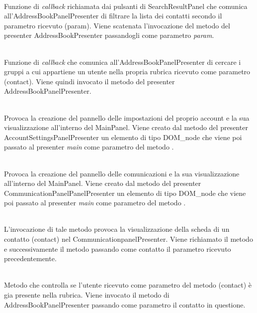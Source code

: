 \begin{description}
\item{}\\
Funzione di \textit{callback} richiamata dai pulsanti di SearchResultPanel che comunica all'AddressBookPanelPresenter di filtrare la lista dei contatti secondo il parametro ricevuto (param). Viene scatenata l'invocazione del metodo  del presenter AddressBookPresenter passandogli come parametro \textit{param}.

\item{}\\
Funzione di \textit{callback} che comunica all'AddressBookPanelPresenter di cercare i gruppi a cui appartiene un utente nella propria rubrica ricevuto come parametro (contact). Viene quindi invocato il metodo  del presenter AddressBookPanelPresenter.

\item{}\\
Provoca la creazione del pannello delle impostazioni del proprio account e la sua visualizzazione all'interno del MainPanel. Viene creato dal metodo  del presenter AccountSettingsPanelPresenter un elemento di tipo DOM\_node che viene poi passato al presenter \textit{main} come parametro del metodo .


\item{}\\
Provoca la creazione del pannello delle comunicazioni e la sua visualizzazione all'interno del MainPanel. Viene creato dal metodo  del presenter CommunicationPanelPanelPresenter un elemento di tipo DOM\_node che viene poi passato al presenter \textit{main} come parametro del metodo .

\item{}\\
L'invocazione di tale metodo provoca la visualizzazione della scheda di un contatto (contact) nel CommunicationpanelPresenter. Viene richiamato il metodo  e successivamente il metodo  passando come contatto il parametro ricevuto precedentemente.

\item{}\\
Metodo che controlla se l'utente ricevuto come parametro del metodo (contact) è gia presente nella rubrica. Viene invocato il metodo  di AddressBookPanelPresenter passando come parametro il contatto in questione.


\end{description}
